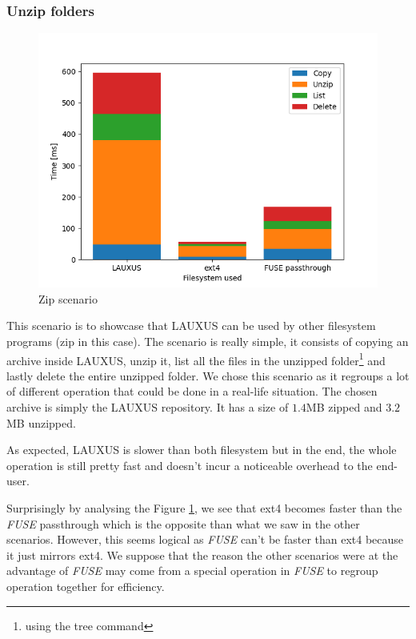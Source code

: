 \documentclass[../main.tex]{subfiles}
\begin{document}
\subsubsection{Unzip folders}%
\label{section:analysis:zip}
\begin{figure}[h]
    \centering
    \includegraphics[width=.8\textwidth]{images/analysis/zip}
    
    \caption{Zip scenario}
    \label{figure:analysis:zip}
\end{figure}
\par This scenario is to showcase that LAUXUS can be used by other filesystem programs (zip in this case). The scenario is really simple, it consists of copying an archive inside LAUXUS, unzip it, list all the files in the unzipped folder\footnote{using the tree command} and lastly delete the entire unzipped folder. We chose this scenario as it regroups a lot of different operation that could be done in a real-life situation. The chosen archive is simply the LAUXUS repository. It has a size of $1.4$MB zipped and $3.2$MB unzipped.
\par As expected, LAUXUS is slower than both filesystem but in the end, the whole operation is still pretty fast and doesn't incur a noticeable overhead to the end-user.
\par Surprisingly by analysing the Figure \ref{figure:analysis:zip}, we see that ext4 becomes faster than the \textit{FUSE} passthrough which is the opposite than what we saw in the other scenarios. However, this seems logical as \textit{FUSE} can't be faster than ext4 because it just mirrors ext4. We suppose that the reason the other scenarios were at the advantage of \textit{FUSE} may come from a special operation in \textit{FUSE} to regroup operation together for efficiency.
\end{document}
